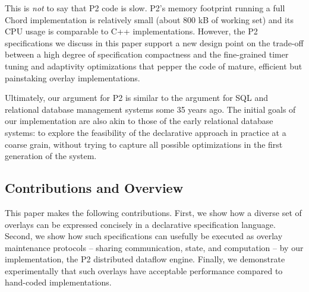 \documentclass{sig-alt-full}
\def\Sys{P2\xspace}
\newcommand{\note}[1]{}
\begin{document}
\note{NEW FOR CAMERA-READY}
This is \emph{not} to say that \Sys code is slow. \Sys's memory
footprint running a full Chord implementation is relatively small
(about 800 kB of working set) and its CPU usage is comparable to C++ 
implementations.  However, the \Sys specifications we discuss in this
paper support a new design point on the trade-off between a high degree of
specification compactness and the 
fine-grained timer tuning and adaptivity optimizations that pepper the
code of mature, efficient but painstaking overlay implementations.

Ultimately, our argument
for \Sys is similar to the argument for SQL and relational database
management systems some 35 years ago.  The initial
goals of our implementation are also akin to those of the early relational
database systems: to explore the feasibility of the declarative
approach in practice at a coarse grain, without trying to capture all
possible optimizations in the first generation of the system.


\subsection{Contributions and Overview}
This paper makes
the following contributions.  First, we show how a diverse set of
overlays can be expressed concisely in a declarative specification
language.  Second, we show how such specifications can usefully be
executed as overlay maintenance protocols -- sharing communication,
state, and computation -- by our implementation, the \Sys
distributed dataflow engine.  Finally, we demonstrate experimentally
that such overlays have acceptable performance compared to
hand-coded implementations. 

\end{document}
